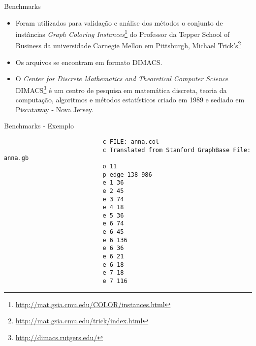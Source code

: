 			\begin{frame}[fragile]{Benchmarks}
				
				\begin{itemize}
					
					\item Foram utilizados para validação e análise dos métodos o conjunto de instâncias \textit{Graph Coloring Instances}\footnote{\url{http://mat.gsia.cmu.edu/COLOR/instances.html}} do Professor da Tepper School of Business da universidade Carnegie Mellon em Pittsburgh, Michael Trick's\footnote{\url{http://mat.gsia.cmu.edu/trick/index.html}}
					
					\bigskip
					
					\item Os arquivos se encontram em formato DIMACS.
					
					\bigskip
					
					\item O \textit{Center for Discrete Mathematics and Theoretical Computer Science} DIMACS\footnote{\url{http://dimacs.rutgers.edu/}} é um centro de pesquisa em matemática discreta, teoria da computação, algoritmos e métodos estatísticos criado em 1989 e sediado em Piscataway - Nova Jersey.
					
					
				\end{itemize}
				
			\end{frame}
			
			\begin{frame}[fragile]{Benchmarks -  Exemplo}
				
					
					{
						\footnotesize
						\begin{block}{}
							
							\begin{verbatim}
							c FILE: anna.col
							c Translated from Stanford GraphBase File: anna.gb
							o 11
							p edge 138 986
							e 1 36
							e 2 45
							e 3 74
							e 4 18
							e 5 36
							e 6 74
							e 6 45
							e 6 136
							e 6 36
							e 6 21
							e 6 18
							e 7 18
							e 7 116
							\end{verbatim}	
						\end{block}
					}
				
			\end{frame}
			

